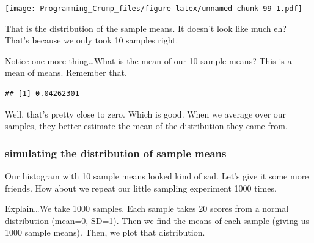 \documentclass[]{book}
\newenvironment{Shaded}{\begin{snugshade}}{\end{snugshade}}
\newcommand{\KeywordTok}[1]{\textcolor[rgb]{0.13,0.29,0.53}{\textbf{{#1}}}}
\newcommand{\NormalTok}[1]{{#1}}
\theoremstyle{definition}
\theoremstyle{definition}
\theoremstyle{definition}
\theoremstyle{remark}
\begin{document}
\texttt{[image: Programming\_Crump\_files/figure-latex/unnamed-chunk-99-1.pdf]}

That is the distribution of the sample means. It doesn't look like much
eh? That's because we only took 10 samples right.

Notice one more thing\ldots{}What is the mean of our 10 sample means?
This is a mean of means. Remember that.

\begin{Shaded}
\end{Shaded}

\begin{verbatim}
## [1] 0.04262301
\end{verbatim}

Well, that's pretty close to zero. Which is good. When we average over
our samples, they better estimate the mean of the distribution they came
from.

\subsubsection{simulating the distribution of sample
means}\label{simulating-the-distribution-of-sample-means}

Our histogram with 10 sample means looked kind of sad. Let's give it
some more friends. How about we repeat our little sampling experiment
1000 times.

Explain\ldots{}We take 1000 samples. Each sample takes 20 scores from a
normal distribution (mean=0, SD=1). Then we find the means of each
sample (giving us 1000 sample means). Then, we plot that distribution.
\end{document}
